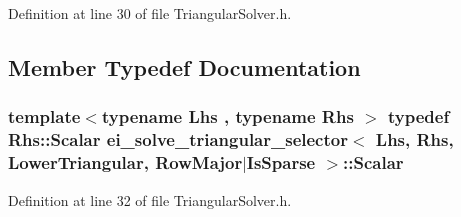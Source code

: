 Definition at line 30 of file Triangular\-Solver.\-h.



\subsection{Member Typedef Documentation}
\hypertarget{structei__solve__triangular__selector_3_01_lhs_00_01_rhs_00_01_lower_triangular_00_01_row_major_7_is_sparse_01_4_a9c48229c1b5c03d130c36c3c2246d68e}{
\subsubsection[{Scalar}]{\setlength{\rightskip}{0pt plus 5cm}template$<$typename Lhs , typename Rhs $>$ typedef Rhs\-::\-Scalar {\bf ei\-\_\-solve\-\_\-triangular\-\_\-selector}$<$ Lhs, Rhs, {\bf Lower\-Triangular}, {\bf Row\-Major}$|${\bf Is\-Sparse} $>$\-::{\bf Scalar}}}\label{structei__solve__triangular__selector_3_01_lhs_00_01_rhs_00_01_lower_triangular_00_01_row_major_7_is_sparse_01_4_a9c48229c1b5c03d130c36c3c2246d68e}


Definition at line 32 of file Triangular\-Solver.\-h.



